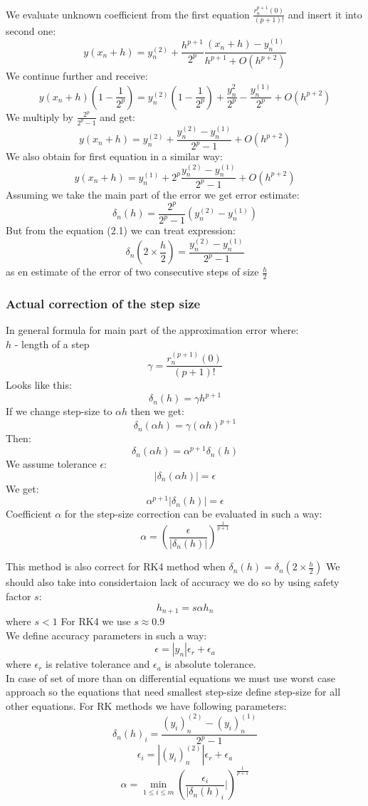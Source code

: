 \documentclass[12pt]{report}
\begin{document}
We evaluate unknown coefficient from the first equation $ \frac{r_n^{p+1}(0)}{(p+1)!} $ and insert it into second one:
\[ y(x_n+h) = y_n^{(2)} + \frac{h^{p+1}}{2^p}\frac{(x_n+h) - y_n^{(1)}}{h^{p+1} + O(h^{p+2})} \]
We continue further and receive:
\[ y(x_n + h)(1-\frac{1}{2^p}) = y_n^{(2)}(1-\frac{1}{2^p}) + \frac{y_n^{2}}{2^p} - \frac{y_n^{(1)}}{2^p} + O(h^{p+2}) \]
We multiply by $\frac{2^p}{2^p - 1}$ and get:
\begin{equation}
y(x_n+h) = y_n^{(2)} + \frac{ y_n^{(2)} - y_n^{(1)} }{ 2^p - 1 } + O(h^{p+2})
\end{equation}
We also obtain for first equation in a similar way:
 \[ y(x_n+h) = y_n^{(1)} + 2^p\frac{y_n^{(2)} - y_n^{(1)}}{2^p - 1} + O(h^{p+2}) \]
Assuming we take the main part of the error we get error estimate:
\[ \delta_n(h) = \frac{2^p}{2^p-1}(y_n^{(2)} - y_n^{(1)}) \]
But from the equation (2.1) we can treat expression:
\[ \delta_n(2 \times \frac{h}{2}) = \frac{ y_n^{(2)} - y_n^{(1)}}{2^p - 1} \]
as en estimate of the error of two consecutive steps of size $\frac{h}{2}$
\subsubsection{Actual correction of the step size}
In general formula for main part of the approximation error where:
\\ $h$ - length of a step
\[ \gamma = \frac{r_n^{(p+1)}(0)}{(p+1)!} \]
Looks like this:
\[ \delta_n(h) = \gamma h^{p+1} \]
If we change step-size to $\alpha h$ then we get:
\[ \delta_n(\alpha h) = \gamma (\alpha h)^{p+1} \]
Then:
\[ \delta_n(\alpha h) = \alpha^{p+1} \delta_n (h) \]
We assume tolerance $\epsilon$:
\[ |\delta_n(\alpha h)| = \epsilon \]
We get:
\[ \alpha^{p+1}|\delta_n(h)| = \epsilon \]
Coefficient $\alpha$ for the step-size correction can be evaluated in such a way:
\[ \alpha = (\frac{\epsilon}{|\delta_n (h)|})^{\frac{1}{p+1}} \]

This method is also correct for RK4 method when $\delta_n(h) = \delta_n(2 \times \frac{h}{2}) $
We should also take into considertaion lack of accuracy we do so by using safety factor $s$:
\[ h_{n+1} = s \alpha h_n \]
where $ s < 1 $
For RK4 we use $ s \approx 0.9 $ \\
We define accuracy parameters in such a way:
\[ \epsilon = |y_n| \epsilon_r + \epsilon_a \]
where $\epsilon_r$ is relative tolerance and $\epsilon_a$ is absolute tolerance. \\
In case of set of more than on differential equations we must use worst case approach so the equations that need smallest step-size define step-size for all other equations.
\newpage
For RK methods we have following parameters:
\[ \delta_n(h)_i = \frac{(y_i)_n^{(2)} - (y_i)_n^{(1)}}{2^p - 1} \]
\[ \epsilon_i = |(y_i)_n^{(2)}| \epsilon_r + \epsilon_a \]
\[ \alpha = \min_{1 \leq i \leq m} (\frac{\epsilon_i}{|\delta_n(h)_i}|)^{\frac{1}{p+1}} \]
\end{document}
